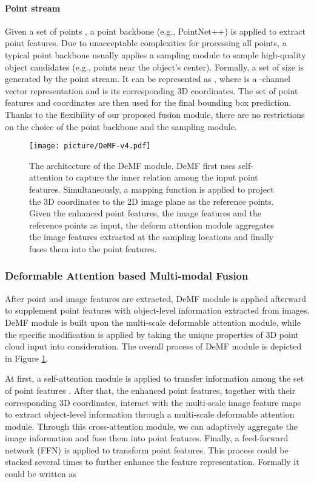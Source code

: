 \documentclass[runningheads]{llncs}
\begin{document}
\paragraph{Point stream}

Given a set of  points , a point backbone (e.g., PointNet++) is applied to extract point features. Due to unacceptable complexities for processing all points, a typical point backbone usually applies a sampling module to sample high-quality object candidates (e.g., points near the object's center). Formally, a set of size  is generated by the point stream. It can be represented as , where   is a -channel vector representation and  is its corresponding 3D coordinates. The set of point features and coordinates are then used for the final bounding box prediction. Thanks to the flexibility of our proposed fusion module, there are no restrictions on the choice of the point backbone and the sampling module.

\begin{figure}[t]
    \centering
    \texttt{[image: picture/DeMF-v4.pdf]}
    \caption{The architecture of the DeMF module. DeMF first uses self-attention to capture the inner relation among the input point features. Simultaneously, a mapping function  is applied to project the 3D coordinates to the 2D image plane as the reference points. Given the enhanced point features, the image features and the reference points as input, the deform attention module aggregates the image features extracted at the sampling locations and finally fuses them into the point features.}
    \label{fig:demf}
\end{figure}

\subsubsection{Deformable Attention based Multi-modal Fusion}

After point and image features are extracted, DeMF module is applied afterward to supplement point features with object-level information extracted from images. DeMF module is built upon the multi-scale deformable attention module, while the specific modification is applied by taking the unique properties of 3D point cloud input into consideration. The overall process of DeMF module is depicted in Figure \ref{fig:demf}.

At first, a self-attention module is applied to transfer information among the set of point features  . After that, the enhanced point features, together with their corresponding 3D coordinates, interact with the multi-scale image feature maps to extract object-level information through a multi-scale deformable attention module. Through this cross-attention module, we can adaptively aggregate the image information and fuse them into point features. Finally, a feed-forward network (FFN) is applied to transform point features. This process could be stacked several times to further enhance the
feature representation. Formally it could be written as
\end{document}
